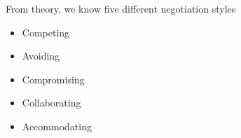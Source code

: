 


\noindent From theory, we know five different negotiation styles

\begin{itemize}
	\item Competing
	\item Avoiding
	\item Compromising
	\item Collaborating
	\item Accommodating
\end{itemize}
























